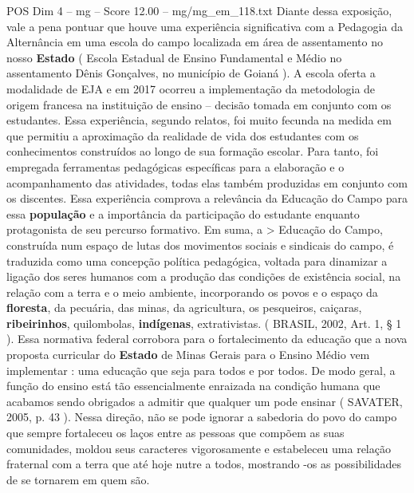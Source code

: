 \begin{textsample}{POS Dim 4 – mg – Score 12.00 – mg/mg\_em\_118.txt}
Diante dessa exposição, vale a pena pontuar que houve uma experiência significativa com a Pedagogia da Alternância em uma escola do campo localizada em área de assentamento no nosso \textbf{Estado} ( Escola Estadual de Ensino Fundamental e Médio no assentamento Dênis Gonçalves, no município de Goianá ).
A escola oferta a modalidade de EJA e em 2017 ocorreu a implementação da metodologia de origem francesa na instituição de ensino – decisão tomada em conjunto com os estudantes.
Essa experiência, segundo relatos, foi muito fecunda na medida em que permitiu a aproximação da realidade de vida dos estudantes com os conhecimentos construídos ao longo de sua formação escolar.
Para tanto, foi empregada ferramentas pedagógicas específicas para a elaboração e o acompanhamento das atividades, todas elas também produzidas em conjunto com os discentes.
Essa experiência comprova a relevância da Educação do Campo para essa \textbf{população} e a importância da participação do estudante enquanto protagonista de seu percurso formativo.
Em suma, a > Educação do Campo, construída num espaço de lutas dos movimentos sociais e sindicais do campo, é traduzida como uma concepção política pedagógica, voltada para dinamizar a ligação dos seres humanos com a produção das condições de existência social, na relação com a terra e o meio ambiente, incorporando os povos e o espaço da \textbf{floresta}, da pecuária, das minas, da agricultura, os pesqueiros, caiçaras, \textbf{ribeirinhos}, quilombolas, \textbf{indígenas}, extrativistas. ( BRASIL, 2002, Art. 1, § 1 ).
Essa normativa federal corrobora para o fortalecimento da educação que a nova proposta curricular do \textbf{Estado} de Minas Gerais para o Ensino Médio vem implementar : uma educação que seja para todos e por todos.
De modo geral, a função do ensino está tão essencialmente enraizada na condição humana que acabamos sendo obrigados a admitir que qualquer um pode ensinar ( SAVATER, 2005, p. 43 ).
Nessa direção, não se pode ignorar a sabedoria do povo do campo que sempre fortaleceu os laços entre as pessoas que compõem as suas comunidades, moldou seus caracteres vigorosamente e estabeleceu uma relação fraternal com a terra que até hoje nutre a todos, mostrando -os as possibilidades de se tornarem em quem são.

\end{textsample}

